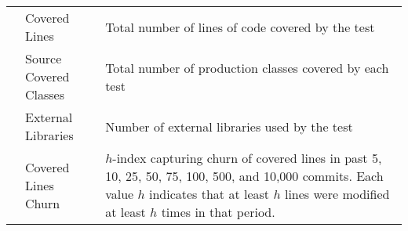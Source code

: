 \begin{table*}[t]
\begin{tabularx}{\textwidth}{l | l X}
	&	Covered Lines  	&	 Total number of lines of code covered by the test  \\
	&	Source Covered Classes  	&	 Total number of production classes covered by each test \\
	&	External Libraries  	&	 Number of external libraries used by the test \\
	&	Covered Lines Churn 	&	 $h$-index capturing churn of covered lines in past 5, 10, 25, 50, 75, 100, 500, and 10,000 commits. Each value $h$ indicates that at least $h$ lines were modified at least $h$ times in that period.\\
\bottomrule
    \end{tabularx}
\end{table*}

